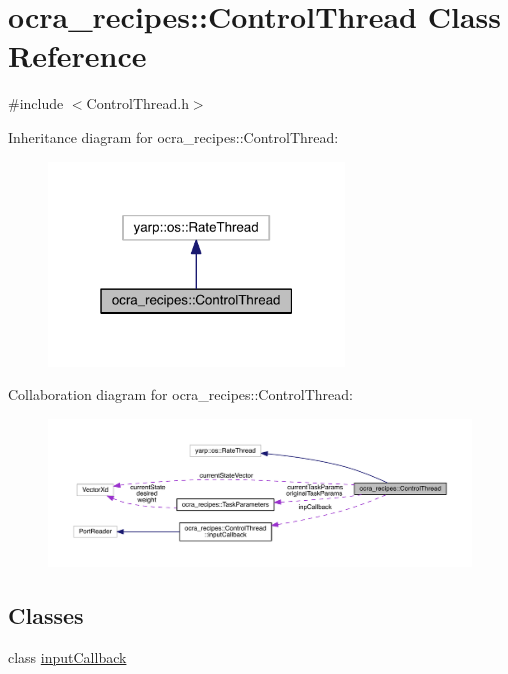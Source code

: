\hypertarget{classocra__recipes_1_1ControlThread}{}\section{ocra\+\_\+recipes\+:\+:Control\+Thread Class Reference}
\label{classocra__recipes_1_1ControlThread}


{\ttfamily \#include $<$Control\+Thread.\+h$>$}



Inheritance diagram for ocra\+\_\+recipes\+:\+:Control\+Thread\+:\nopagebreak
\begin{figure}[H]
\begin{center}
\leavevmode
\includegraphics[width=223pt]{d0/db7/classocra__recipes_1_1ControlThread__inherit__graph}
\end{center}
\end{figure}


Collaboration diagram for ocra\+\_\+recipes\+:\+:Control\+Thread\+:\nopagebreak
\begin{figure}[H]
\begin{center}
\leavevmode
\includegraphics[width=350pt]{d0/df5/classocra__recipes_1_1ControlThread__coll__graph}
\end{center}
\end{figure}
\subsection*{Classes}
\begin{DoxyCompactItemize}
\item 
class \hyperlink{classocra__recipes_1_1ControlThread_1_1inputCallback}{input\+Callback}
\end{DoxyCompactItemize}
